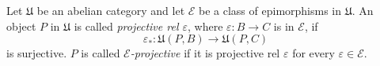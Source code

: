 Let $\mathfrak{U}$ be an abelian category and let $\mathcal{E}$ be a class of epimorphisms in $\mathfrak{U}$. An object $P$ in $\mathfrak{U}$ is called \emph{projective rel $\varepsilon$}, where $\varepsilon : B \to C$ is in $\mathcal{E}$, if
$$\varepsilon_* : \mathfrak{U}(P, B) \longrightarrow \mathfrak{U}(P, C)$$
is surjective. $P$ is called \emph{$\mathcal{E}$-projective} if it is projective rel $\varepsilon$ for every $\varepsilon \in \mathcal{E}$.